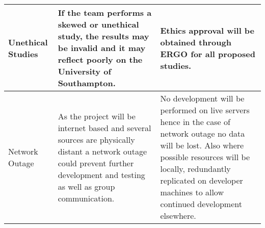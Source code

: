 \begin{center}
\begin{landscape}
\begin{longtable}{|p{3cm}|p{7cm}|p{12cm}|}
        Unethical Studies                                & If the team performs a skewed or unethical study, the results may be invalid and it may reflect poorly on the University of Southampton.                                                                                                                                                                                                                                     & Ethics approval will be obtained through ERGO for all proposed studies.                                                                                                                                                                                                                                                                                                                                                                                                                                                                                                                                                                                                                                                                                                                                                                                                                                                                                                                                                                  \\ \hline
        Network Outage                                   & As the project will be internet based and several sources are physically distant a network outage could prevent further development and testing as well as group communication.                                                                                                                                                                                              & No development will be performed on live servers hence in the case of network outage no data will be lost. Also where possible resources will be locally, redundantly replicated on developer machines to allow continued development elsewhere.                                                                                                                                                                                                                                                                                                                                                                                                                                                                                                                                                                                                                                                                                                                                                                                         \\
        \hline
    \end{longtable}
    \end{landscape}
\end{center}